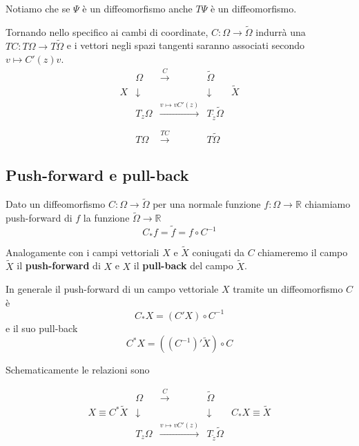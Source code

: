 \documentclass[11pt,a4paper,twoside]{book}
\theoremstyle{esss}
\theoremstyle{dotless}
\numberwithin{equation}{section} %
\begin{document}
Notiamo che se $\Psi$ è un diffeomorfismo anche $T\Psi$ è un diffeomorfismo.
\par
Tornando nello specifico ai cambi di coordinate, $C:\Omega\rightarrow\tilde{\Omega}$ indurrà una $TC:T\Omega\rightarrow T\tilde{\Omega}$ e i vettori negli spazi tangenti saranno associati secondo $v\mapsto C'(z)v$.
\[
\begin{array}{ccccc}
 & \Omega & \overset{C}{\longrightarrow} & \tilde{\Omega} &  \\
X &\downarrow &  & \downarrow & \tilde{X} \\
 & T_z\Omega & \xrightarrow[]{v\mapsto vC'(z)} & T_{\tilde{z}}\tilde{\Omega}& \\
 \\
 & T\Omega & \overset{TC}{\longrightarrow} & T\tilde{\Omega} &
\end{array}
\]


\subsection{Push-forward e pull-back}
Dato un diffeomorfismo $C:\Omega\rightarrow\tilde{\Omega}$ per una normale funzione $f:\Omega\rightarrow\mathbb{R}$ chiamiamo push-forward di $f$ la funzione $\tilde{\Omega}\rightarrow\mathbb{R}$
\[
C_{*}f=\tilde{f}=f\circ C^{-1}
\]

Analogamente con i campi vettoriali $X$ e $\tilde{X}$ coniugati da $C$ chiameremo il campo $\tilde{X}$ il \textbf{push-forward} di $X$ e $X$ il \textbf{pull-back} del campo $\tilde{X}$\footnotemark[2].

In generale il push-forward di un campo vettoriale $X$ tramite un diffeomorfismo $C$ è
\begin{equation}\label{push-forward}
C_{*}X=(C'X)\circ C^{-1}
\end{equation}
e il suo pull-back
\begin{equation}\label{pull-back}
C^{*}X=((C^{-1})'\tilde{X})\circ C
\end{equation}

Schematicamente le relazioni sono

\[
\begin{array}{ccccc}
 & \Omega & \overset{C}{\longrightarrow} & \tilde{\Omega} &  \\
X\equiv C^{*}\tilde{X} &\downarrow &  & \downarrow & C_{*}X\equiv\tilde{X} \\
 & T_z\Omega & \xrightarrow[]{v\mapsto vC'(z)} & T_{\tilde{z}}\tilde{\Omega}& \\
\end{array}
\]
\end{document}
